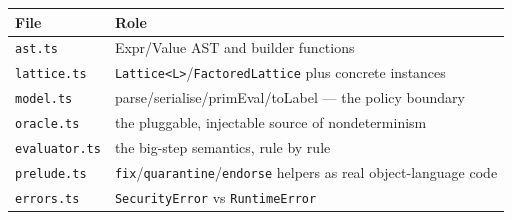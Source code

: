 \documentclass[11pt, a4paper]{article}
\begin{document}
\begin{tabular}{@{}ll@{}}
\toprule
File & Role \\
\midrule
\texttt{ast.ts} & Expr/Value AST and builder functions \\
\texttt{lattice.ts} & \texttt{Lattice<L>}/\texttt{FactoredLattice} plus concrete instances \\
\texttt{model.ts} & parse/serialise/primEval/toLabel --- the policy boundary \\
\texttt{oracle.ts} & the pluggable, injectable source of nondeterminism \\
\texttt{evaluator.ts} & the big-step semantics, rule by rule \\
\texttt{prelude.ts} & \texttt{fix}/\texttt{quarantine}/\texttt{endorse} helpers as real object-language code \\
\texttt{errors.ts} & \texttt{SecurityError} vs \texttt{RuntimeError} \\
\bottomrule
\end{tabular}
\end{document}

